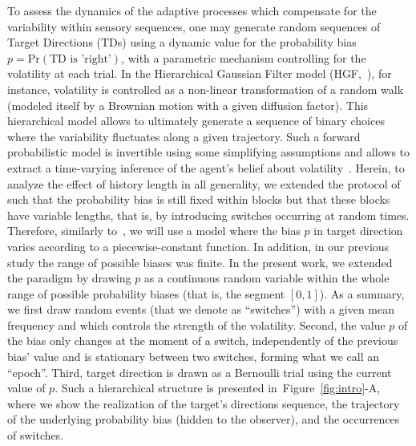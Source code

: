 \documentclass[12pt,english]{article}%
\newcommand{\citep}[1]{\parencite{#1}}
\newcommand{\citet}[1]{\textcite{#1}}
\newcommand{\seeFig}[1]{Figure~\ref{fig:#1}}
\begin{document}
To assess the dynamics of the adaptive processes
which compensate for the variability within sensory sequences,
one may generate random sequences of Target Directions (TDs)
using a dynamic value for the probability bias $p = \text{Pr}(\text{TD is 'right'})$,
with a parametric mechanism controlling for the volatility at each trial.
In the Hierarchical Gaussian Filter model (HGF,~\citet{Mathys11}), for instance,
volatility is controlled as a non-linear transformation
of a random walk (modeled itself by a Brownian motion with a given diffusion factor).
This hierarchical model allows to ultimately generate a sequence of binary choices
where the variability fluctuates along a given trajectory.
Such a forward probabilistic model is invertible
using some simplifying assumptions and allows
to extract a time-varying inference of the agent's belief about volatility~\citep{Vossel14}.
Herein, to analyze the effect of history length in all generality,
we  extended the protocol of~\citet{Montagnini2010} such that the probability bias
is still fixed within blocks but that these blocks have variable lengths,
that is, by introducing switches occurring at random times.
Therefore, similarly to~\citet{Meyniel13}, we will use a model where
the bias $p$ in target direction varies according to a piecewise-constant function.
In addition, in our previous study
the range of possible biases was finite.
In the present work, we extended the paradigm
by drawing $p$ as a continuous random variable
within the whole range of possible probability biases (that is, the segment $[ 0, 1 ]$).
As a summary, we first draw random events (that we denote as ``switches'')
with a given mean frequency and which controls the strength of the volatility.
Second, the value $p$ of the bias only changes at the moment of a switch,
independently of the previous bias' value
and is stationary between two switches, forming what we call an ``epoch''.
Third, target direction is drawn as a Bernoulli trial using the current value of $p$.
Such a hierarchical structure is presented in~\seeFig{intro}-A,
where we show the realization of the target's directions sequence,
the trajectory of the underlying probability bias (hidden to the observer), and
the occurrences of switches.
\end{document}
